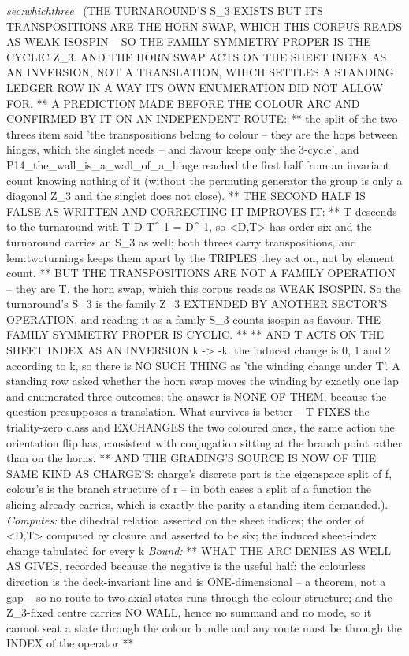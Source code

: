 \begin{description}
\textit{sec:whichthree} \ (THE TURNAROUND'S S\_3 EXISTS BUT ITS TRANSPOSITIONS ARE THE HORN SWAP, WHICH THIS CORPUS READS AS WEAK ISOSPIN -- SO THE FAMILY SYMMETRY PROPER IS THE CYCLIC Z\_3. AND THE HORN SWAP ACTS ON THE SHEET INDEX AS AN INVERSION, NOT A TRANSLATION, WHICH SETTLES A STANDING LEDGER ROW IN A WAY ITS OWN ENUMERATION DID NOT ALLOW FOR. ** A PREDICTION MADE BEFORE THE COLOUR ARC AND CONFIRMED BY IT ON AN INDEPENDENT ROUTE: ** the split-of-the-two-threes item said 'the transpositions belong to colour -- they are the hops between hinges, which the singlet needs -- and flavour keeps only the 3-cycle', and P14\_the\_wall\_is\_a\_wall\_of\_a\_hinge reached the first half from an invariant count knowing nothing of it (without the permuting generator the group is only a diagonal Z\_3 and the singlet does not close). ** THE SECOND HALF IS FALSE AS WRITTEN AND CORRECTING IT IMPROVES IT: ** T descends to the turnaround with T D T\textasciicircum{}-1 = D\textasciicircum{}-1, so <D,T> has order six and the turnaround carries an S\_3 as well; both threes carry transpositions, and lem:twoturnings keeps them apart by the TRIPLES they act on, not by element count. ** BUT THE TRANSPOSITIONS ARE NOT A FAMILY OPERATION -- they are T, the horn swap, which this corpus reads as WEAK ISOSPIN. So the turnaround's S\_3 is the family Z\_3 EXTENDED BY ANOTHER SECTOR'S OPERATION, and reading it as a family S\_3 counts isospin as flavour. THE FAMILY SYMMETRY PROPER IS CYCLIC. ** ** AND T ACTS ON THE SHEET INDEX AS AN INVERSION k -> -k: the induced change is 0, 1 and 2 according to k, so there is NO SUCH THING as 'the winding change under T'. A standing row asked whether the horn swap moves the winding by exactly one lap and enumerated three outcomes; the answer is NONE OF THEM, because the question presupposes a translation. What survives is better -- T FIXES the triality-zero class and EXCHANGES the two coloured ones, the same action the orientation flip has, consistent with conjugation sitting at the branch point rather than on the horns. ** AND THE GRADING'S SOURCE IS NOW OF THE SAME KIND AS CHARGE'S: charge's discrete part is the eigenspace split of f, colour's is the branch structure of r -- in both cases a split of a function the slicing already carries, which is exactly the parity a standing item demanded.). 
\emph{Computes:} the dihedral relation asserted on the sheet indices; the order of <D,T> computed by closure and asserted to be six; the induced sheet-index change tabulated for every k
 \emph{Bound:} ** WHAT THE ARC DENIES AS WELL AS GIVES, recorded because the negative is the useful half: the colourless direction is the deck-invariant line and is ONE-dimensional -- a theorem, not a gap -- so no route to two axial states runs through the colour structure; and the Z\_3-fixed centre carries NO WALL, hence no summand and no mode, so it cannot seat a state through the colour bundle and any route must be through the INDEX of the operator **

\end{description}
